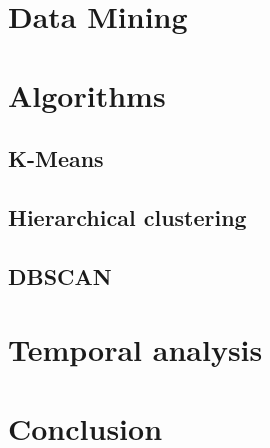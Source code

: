 \documentclass[12pt]{article}
\begin{document}
\section{Data Mining}

\section{Algorithms}

\subsection{K-Means}

\subsection{Hierarchical clustering}

\subsection{DBSCAN}

\section{Temporal analysis}

\section{Conclusion}





%
\end{document}
